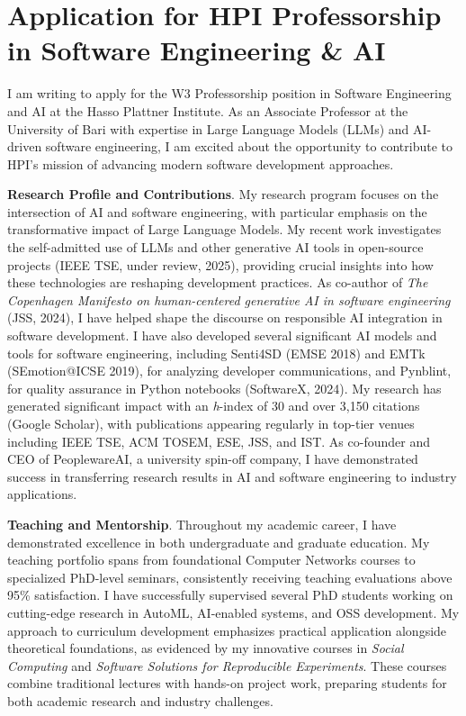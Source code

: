 \section{Application for HPI Professorship in Software Engineering \& AI}

I am writing to apply for the W3 Professorship position in Software Engineering and AI at the Hasso Plattner Institute.
As an Associate Professor at the University of Bari with expertise in Large Language Models (LLMs) and AI-driven software engineering, I am excited about the opportunity to contribute to HPI's mission of advancing modern software development approaches.

\textbf{Research Profile and Contributions}.
My research program focuses on the intersection of AI and software engineering, with particular emphasis on the transformative impact of Large Language Models.
My recent work investigates the self-admitted use of LLMs and other generative AI tools in open-source projects (IEEE TSE, under review, 2025), providing crucial insights into how these technologies are reshaping development practices. 
As co-author of \textit{The Copenhagen Manifesto on human-centered generative AI in software engineering} (JSS, 2024), I have helped shape the discourse on responsible AI integration in software development. 
I have also developed several significant AI models and tools for software engineering, including Senti4SD (EMSE 2018) and EMTk (SEmotion@ICSE 2019), for analyzing developer communications, and Pynblint, for quality assurance in Python notebooks (SoftwareX, 2024).
My research has generated significant impact with an \textit{h}-index of 30 and over 3,150 citations (Google Scholar), with publications appearing regularly in top-tier venues including IEEE TSE, ACM TOSEM, ESE, JSS, and IST.
As co-founder and CEO of PeoplewareAI, a university spin-off company, I have demonstrated success in transferring research results in AI and software engineering to industry applications. 

\textbf{Teaching and Mentorship}.
Throughout my academic career, I have demonstrated excellence in both undergraduate and graduate education. 
My teaching portfolio spans from foundational Computer Networks courses to specialized PhD-level seminars, consistently receiving teaching evaluations above 95\% satisfaction. 
I have successfully supervised several PhD students working on cutting-edge research in AutoML, AI-enabled systems, and OSS development. 
My approach to curriculum development emphasizes practical application alongside theoretical foundations, as evidenced by my innovative courses in \textit{Social Computing} and \textit{Software Solutions for Reproducible Experiments}.
These courses combine traditional lectures with hands-on project work, preparing students for both academic research and industry challenges.

